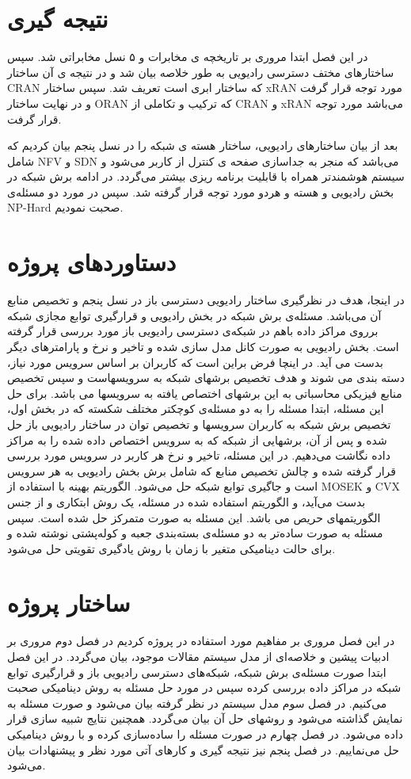 \section{نتیجه گیری}
  در این فصل ابتدا مروری بر تاریخچه ی مخابرات و ۵ نسل مخابراتی شد. سپس ساختارهای مختف دسترسی رادیویی به طور خلاصه بیان شد و در نتیجه ی آن ساختار CRAN که ساختار ابری است تعریف شد. سپس ساختار xRAN
  مورد توجه قرار گرفت و در نهایت ساختار ORAN 
  که ترکیب و تکاملی از CRAN و xRAN می‌باشد مورد توجه قرار گرفت.
  
 بعد از بیان ساختارهای رادیویی، ساختار هسته ی شبکه را در نسل پنجم بیان کردیم که شامل 
 NFV و SDN 
 می‌باشد که منجر به جداسازی صفحه ی کنترل از کاربر می‌شود و سیستم هوشمندتر همراه با قابلیت برنامه ریزی بیشتر می‌گردد.
 در ادامه برش شبکه در بخش رادیویی و هسته و هردو مورد توجه قرار گرفته شد.
 سپس در مورد دو مسئله‌ی NP-Hard صحبت نمودیم.
\section{دستاوردهای پروژه}
در اینجا، هدف در نظرگیری ساختار رادیویی دسترسی باز در نسل پنجم و تخصیص منابع آن می‌باشد.
مسئله‌ی برش شبکه در بخش رادیویی و قرارگیری توابع مجازی شبکه برروی مراکز داده باهم در شبکه‌ی دسترسی رادیویی باز مورد بررسی قرار گرفته است. بخش رادیویی به صورت کانل مدل سازی شده و تاخیر و نرخ و پارامترهای دیگر بدست می آید. در اینچا فرض براین است که کاربران بر اساس سرویس مورد نیاز، دسته بندی می شوند و هدف تخصیص برشهای شبکه به سرویسهاست و سپس تخصیص منابع فیزیکی محاسباتی به این برشهای اختصاص یافته به سرویسها می باشد.
برای حل این مسئله، ابتدا مسئله را به دو مسئله‌ی کوچکتر مختلف شکسته که در بخش اول، تخصیص برش شبکه به کاربران سرویسها و تخصیص توان در ساختار رادیویی باز حل شده و پس از آن، برشهایی از شبکه که به سرویس اختصاص داده شده را به مراکز داده نگاشت می‌دهیم.
در این مسئله، تاخیر و نرخ هر کاربر در سرویس مورد بررسی قرار گرفته شده و چالش تخصیص منابع که شامل برش بخش رادیویی به هر سرویس است و جاگیری توابع شبکه حل می‌شود.
الگوریتم بهینه  با استفاده از MOSEK و CVX بدست می‌آید، و الگوریتم استفاده شده در مسئله، یک روش ابتکاری و از جنس الگوریتمهای حریص می باشد. این مسئله به صورت متمرکز حل شده است. 
سپس مسئله به صورت ساده‌تر به دو مسئله‌ی بسته‌بندی جعبه و کوله‌پشتی نوشته شده و برای حالت دینامیکی متغیر با زمان با روش یادگیری تقویتی حل می‌شود.
\section{ساختار پروژه}
در این فصل مروری بر مفاهیم مورد استفاده در پروژه کردیم
در فصل دوم مروری بر ادبیات پیشین و خلاصه‌ای از مدل سیستم مقالات موجود، بیان می‌گردد. در این فصل ابتدا صورت مسئله‌ی برش شبکه، شبکه‌های دسترسی رادیویی باز و قرارگیری توابع شبکه در مراکز داده بررسی کرده سپس در مورد حل مسئله به روش دینامیکی صحبت می‌کنیم.
در فصل سوم مدل سیستم در نظر گرفته بیان می‌شود و صورت مسئله به نمایش گذاشته می‌شود و روشهای حل آن بیان می‌گردد. همچنین  نتایج شبیه سازی قرار داده می‌شود.
در فصل چهارم در صورت مسئله را ساده‌سازی کرده و با روش دینامیکی حل می‌نماییم.
در فصل پنجم نیز نتیجه گیری و کارهای آتی مورد نظر و پیشنهادات بیان می‌شود.   
 